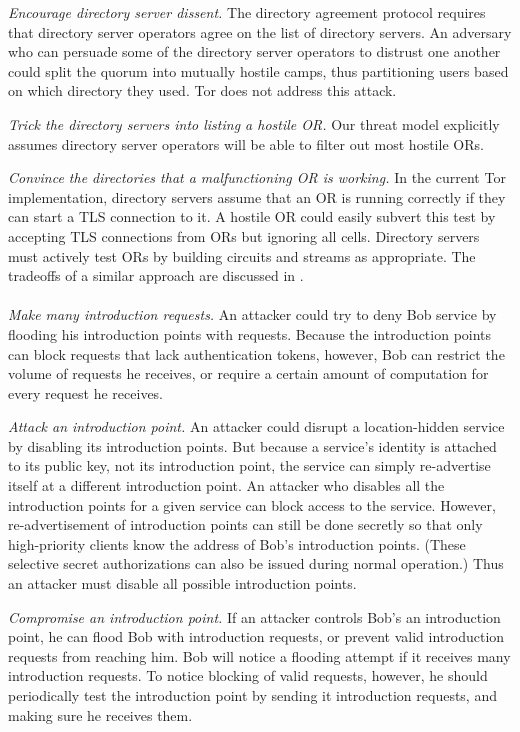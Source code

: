 \documentclass[times,10pt,twocolumn]{article}
\begin{document}
\emph{Encourage directory server dissent.}  The directory
agreement protocol requires that directory server operators agree on 
the list of directory servers.  An adversary who can persuade some
of the directory server operators to distrust one another could
split the quorum into mutually hostile camps, thus partitioning
users based on which directory they used.  Tor does not address
this attack.

\emph{Trick the directory servers into listing a hostile OR.}
Our threat model explicitly assumes directory server operators will
be able to filter out most hostile ORs. 

\emph{Convince the directories that a malfunctioning OR is
working.}  In the current Tor implementation, directory servers
assume that an OR is running correctly if they can start a TLS
connection to it.  A hostile OR could easily subvert this test by
accepting TLS connections from ORs but ignoring all cells. Directory
servers must actively test ORs by building circuits and streams as
appropriate.  The tradeoffs of a similar approach are discussed in
\cite{mix-acc}.\\
  
\\
\emph{Make many introduction requests.}  An attacker could
try to deny Bob service by flooding his introduction points with
requests.  Because the introduction points can block requests that
lack authentication tokens, however, Bob can restrict the volume of
requests he receives, or require a certain amount of computation for
every request he receives.
  
\emph{Attack an introduction point.} An attacker could
disrupt a location-hidden service by disabling its introduction
points.  But because a service's identity is attached to its public
key, not its introduction point, the service can simply re-advertise
itself at a different introduction point.
An attacker who disables all the introduction points for a given
service can block access to the service. However, re-advertisement of
introduction points can still be done secretly so that only
high-priority clients know the address of Bob's introduction
points. (These selective secret authorizations can also be issued
during normal operation.) Thus an attacker must disable
all possible introduction points.

\emph{Compromise an introduction point.} If an attacker controls
Bob's an introduction point, he can flood Bob with
introduction requests, or prevent valid introduction requests from
reaching him. Bob will notice a flooding
attempt if it receives many introduction requests.  To notice
blocking of valid requests, however, he should periodically test the
introduction point by sending it introduction requests, and making
sure he receives them.
\end{document}
